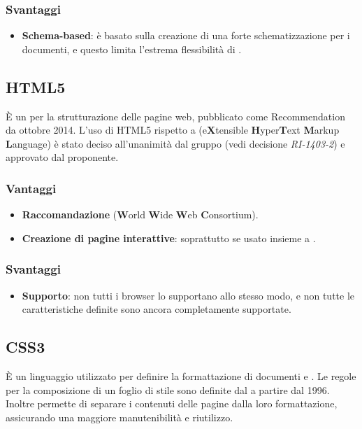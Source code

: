 \subsubsection{Svantaggi}
\begin{itemize}
\item \textbf{Schema-based}: \`e basato sulla creazione di una forte schematizzazione per i documenti, e questo limita l'estrema flessibilità di .
\end{itemize}

\subsection{HTML5}
\`E un  per la strutturazione delle pagine web, pubblicato come  Recommendation da ottobre 2014. L'uso di HTML5 rispetto a  (e\textbf{X}tensible \textbf{H}yper\textbf{T}ext \textbf{M}arkup \textbf{L}anguage) \`e stato deciso all'unanimit\`a dal gruppo (vedi decisione \textit{RI-1403-2}) e approvato dal proponente.
\subsubsection{Vantaggi}
\begin{itemize}
\item \textbf{Raccomandazione } (\textbf{W}orld \textbf{W}ide \textbf{W}eb \textbf{C}onsortium).
\item \textbf{Creazione di pagine interattive}: soprattutto se usato insieme a .
\end{itemize}
\subsubsection{Svantaggi}
\begin{itemize}
\item \textbf{Supporto}: non tutti i browser lo supportano allo stesso modo, e non tutte le caratteristiche definite sono ancora completamente supportate.
\end{itemize}

\subsection{CSS3}
\`E un linguaggio utilizzato per definire la formattazione di documenti  e . Le regole per la composizione di un foglio di stile  sono definite dal  a partire dal 1996. Inoltre permette di separare i contenuti delle pagine  dalla loro formattazione, assicurando una maggiore manutenibilit\`a e riutilizzo.
